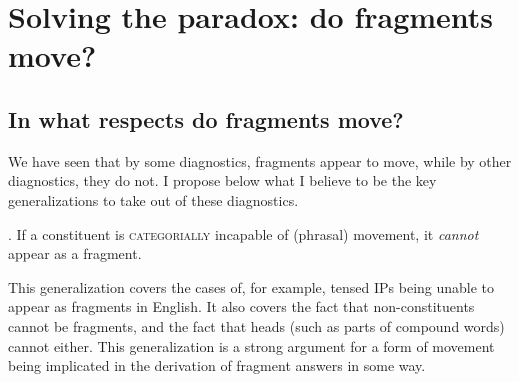 \documentclass[11pt,letterpaper]{article}
\begin{document}
% 
% 
% 
% 
% 

\section{Solving the paradox: do fragments move?}

\subsection{In what respects do fragments move?}

We have seen that by some diagnostics, fragments appear to move, while by other diagnostics, they do not.
I propose below what I believe to be the key generalizations to take out of these diagnostics.

\ex.	If a constituent is \textsc{categorially} incapable of (phrasal) movement, it \emph{cannot} appear as a fragment.

This generalization covers the cases of, for example, tensed IPs being unable to appear as fragments in English.
It also covers the fact that non-constituents cannot be fragments, and the fact that heads (such as parts of compound words) cannot either.
This generalization is a strong argument for a form of movement being implicated in the derivation of fragment answers in some way.
\end{document}
